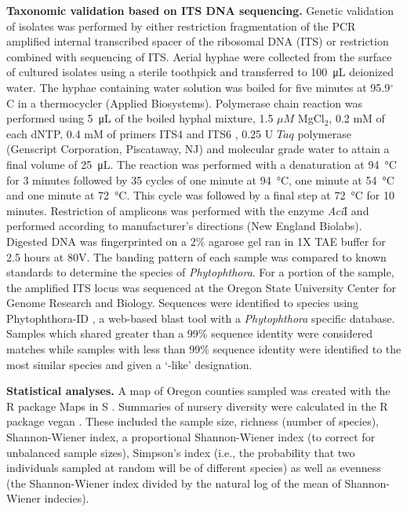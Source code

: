 \documentclass[12pt]{article}
\begin{document}
\textbf{Taxonomic validation based on ITS DNA sequencing.} Genetic validation of isolates was performed by either restriction fragmentation of the PCR amplified internal transcribed spacer of the ribosomal DNA (ITS) or restriction combined with sequencing of ITS.  Aerial hyphae were collected from the surface of cultured isolates using a sterile toothpick and transferred to \SI{100}{\micro\liter} deionized water.  The hyphae containing water solution was boiled for five minutes at 95.9$^\circ$C  in a thermocycler (Applied Biosystems).  Polymerase chain reaction was performed using \SI{5}{\micro\liter} of the boiled hyphal mixture, 1.5 $\mu M$  MgCl$_{2}$, 0.2 mM of each dNTP, 0.4 mM of primers ITS4 and ITS6 \cite{grunwald_etal_2011, cooke_etal_2000}, 0.25 U $Taq$ polymerase (Genscript Corporation, Piscataway, NJ) and molecular grade water to attain a final volume of \SI{25}{\micro\liter}.  The reaction was performed with a denaturation at \SI{94}{\celsius} for 3 minutes followed by 35 cycles of one minute at \SI{94}{\celsius}, one minute at \SI{54}{\celsius} and one minute at \SI{72}{\celsius}.  This cycle was followed by a final step at \SI{72}{\celsius} for 10 minutes.  Restriction of amplicons was performed with the enzyme \emph{Aci}I and performed according to manufacturer's directions (New England Biolabs).  Digested DNA was fingerprinted on a 2\% agarose gel ran in 1X TAE buffer for 2.5 hours at 80V.  The banding pattern of each sample was compared to known standards  to determine the species of \emph{Phytophthora}.  For a portion of the sample, the amplified ITS locus was sequenced at the Oregon State University Center for Genome Research and Biology.  Sequences were identified to species using Phytophthora-ID \cite{grunwald_etal_2011}, a web-based blast \cite{altschul_etal_1990} tool with a \emph{Phytophthora} specific database.  Samples which shared greater than a 99\% sequence identity were considered matches while samples with less than 99\% sequence identity were identified to the most similar species and given a `-like' designation.

\textbf{Statistical analyses.} A map of Oregon counties sampled was created with the R \cite{R} package Maps in S \cite{r_maps}.  Summaries of nursery diversity were calculated in the R \cite{R} package vegan \cite{vegan}.  These included the sample size, richness (number of species), Shannon-Wiener index, a proportional Shannon-Wiener index (to correct for unbalanced sample sizes), Simpson's index (i.e., the probability that two individuals sampled at random will be of different species) as well as evenness (the Shannon-Wiener index divided by the natural log of the mean of Shannon-Wiener indecies).
\end{document}
